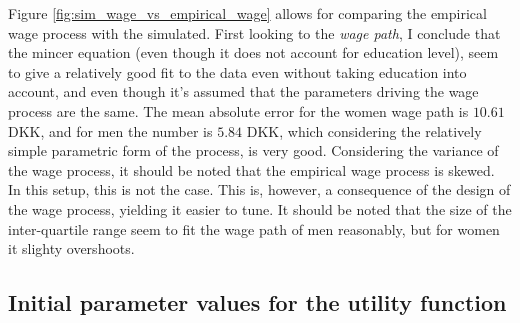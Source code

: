 Figure \ref{fig:sim_wage_vs_empirical_wage} allows for comparing the empirical wage process with the simulated. First looking to the \textit{wage path}, I conclude that the mincer equation (even though it does not account for education level), seem to give a relatively good fit to the data even without taking education into account, and even though it's assumed that the parameters driving the wage process are the same. The mean absolute error for the women wage path is $10.61$ DKK, and for men the number is $5.84$ DKK, which considering the relatively simple parametric form of the process, is very good. Considering the variance of the wage process, it should be noted that the empirical wage process is skewed. In this setup, this is not the case. This is, however, a consequence of the design of the wage process, yielding it easier to tune. It should be noted that the size of the inter-quartile range seem to fit the wage path of men reasonably, but for women it slighty overshoots.

\subsection{Initial parameter values for the utility function}

